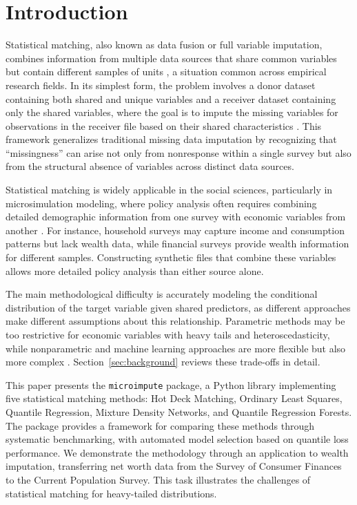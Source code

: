 \section{Introduction}\label{sec:introduction}

Statistical matching, also known as data fusion or full variable imputation, combines information from multiple data sources that share common variables but contain different samples of units \citep{dorazio2006statistical}, a situation common across empirical research fields. In its simplest form, the problem involves a donor dataset containing both shared and unique variables and a receiver dataset containing only the shared variables, where the goal is to impute the missing variables for observations in the receiver file based on their shared characteristics \citep{dorazio2021statistical}. This framework generalizes traditional missing data imputation by recognizing that ``missingness'' can arise not only from nonresponse within a single survey but also from the structural absence of variables across distinct data sources.

Statistical matching is widely applicable in the social sciences, particularly in microsimulation modeling, where policy analysis often requires combining detailed demographic information from one survey with economic variables from another \citep{bourguignon2006microsimulation}. For instance, household surveys may capture income and consumption patterns but lack wealth data, while financial surveys provide wealth information for different samples. Constructing synthetic files that combine these variables allows more detailed policy analysis than either source alone.

The main methodological difficulty is accurately modeling the conditional distribution of the target variable given shared predictors, as different approaches make different assumptions about this relationship. Parametric methods may be too restrictive for economic variables with heavy tails and heteroscedasticity, while nonparametric and machine learning approaches are more flexible but also more complex \citep{meinshausen2006quantile, andridge2010review}. Section~\ref{sec:background} reviews these trade-offs in detail.

This paper presents the \texttt{microimpute} package, a Python library implementing five statistical matching methods: Hot Deck Matching, Ordinary Least Squares, Quantile Regression, Mixture Density Networks, and Quantile Regression Forests. The package provides a framework for comparing these methods through systematic benchmarking, with automated model selection based on quantile loss performance. We demonstrate the methodology through an application to wealth imputation, transferring net worth data from the Survey of Consumer Finances to the Current Population Survey. This task illustrates the challenges of statistical matching for heavy-tailed distributions.

